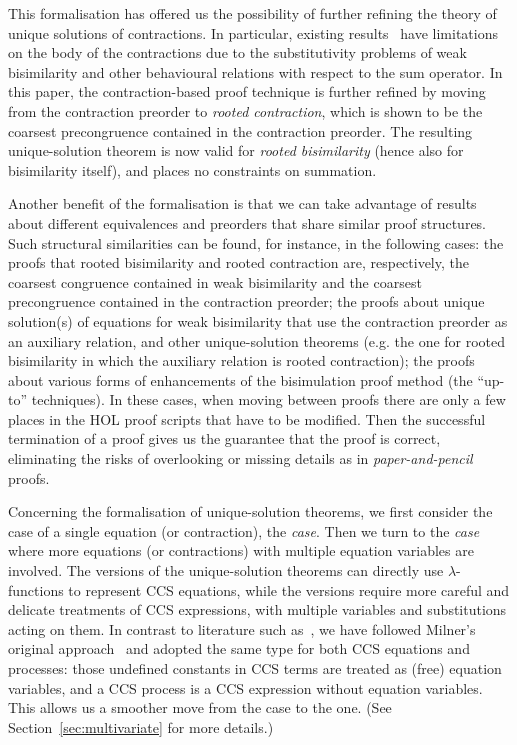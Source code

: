 This formalisation has offered us the possibility of
further refining the theory of unique solutions of contractions.
In particular,  existing results~\cite{sangiorgi2017equations} have
limitations on the body of the contractions due to the
substitutivity problems of weak bisimilarity and other behavioural relations with respect
to the sum operator.
In this paper, the contraction-based proof technique is further
refined by moving from the contraction preorder to
\emph{rooted contraction}, which is shown to be the coarsest
precongruence contained in the contraction preorder.
The resulting unique-solution theorem is now valid for
\emph{rooted bisimilarity} (hence also for bisimilarity itself), and places no 
constraints on summation.

Another benefit of the formalisation is 
that we can take advantage of results about different 
equivalences and preorders that share similar proof structures.
Such structural similarities can be found, for instance, in the %
following cases: the proofs that rooted bisimilarity and rooted
contraction are, respectively, the coarsest congruence contained in
weak bisimilarity and the coarsest precongruence contained in the
contraction preorder; the proofs about unique solution(s) of equations
for weak bisimilarity that use the contraction preorder as an
auxiliary relation, and other unique-solution theorems (e.g. the one
for rooted bisimilarity 
 in which the auxiliary relation is rooted contraction); the
proofs about various forms of enhancements of the bisimulation proof
method (the ``up-to'' techniques).
%
In these cases, when moving between proofs there are only a few places in
the HOL proof scripts that have to be modified.
Then the successful termination of a proof gives us the
 guarantee that the proof is correct, eliminating the risks 
of overlooking or missing details as in \emph{paper-and-pencil} proofs.

Concerning the formalisation of unique-solution theorems,
we first consider the case of a single equation (or contraction), the
\emph{\univariate case}.
Then we turn to the \emph{\multivariate case} where more equations
  (or contractions) with multiple equation variables are involved.
  The \univariate versions of the unique-solution theorems
  can directly use
$\lambda$-functions to represent CCS equations,
while the \multivariate versions require
more careful and delicate treatments of CCS
expressions, with multiple variables and substitutions acting on them.
In contrast to literature such as~\cite{Gorrieri:2015jt},
we have followed Milner's original approach~\cite{milner1990operational} and adopted the same
type for both CCS equations and processes: those undefined constants
in CCS terms are treated as  (free) equation variables, and a CCS
process is a CCS expression without equation variables.  %
This allows us a smoother move from the \univariate case to the \multivariate
one. (See Section~\ref{sec:multivariate} for more details.)


